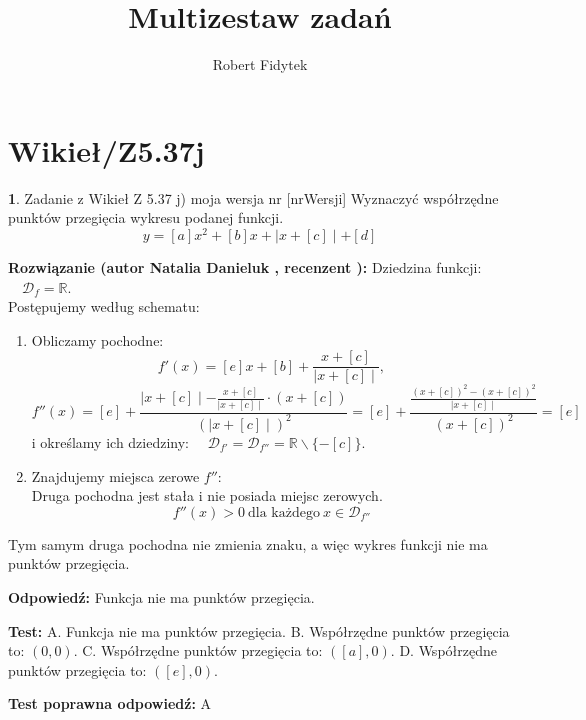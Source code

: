 \documentclass[12pt, a4paper]{article}
\title{Multizestaw zadań}
\author{Robert Fidytek}
\date{}
\theoremstyle{definition} %
\newtheorem{zad}{}
\newcommand{\kategoria}[1]{\section{#1}} %
\newcommand{\zadStart}[1]{\begin{zad}#1\newline} %
\newcommand{\zadStop}{\end{zad}}   %
\newcommand{\rozwStart}[2]{\noindent \textbf{Rozwiązanie (autor #1 , recenzent #2): }\newline} %
\newcommand{\rozwStop}{\newline}                                            %
\newcommand{\odpStart}{\noindent \textbf{Odpowiedź:}\newline}    %
\newcommand{\odpStop}{\newline}                                             %
\newcommand{\testStart}{\noindent \textbf{Test:}\newline} %
\newcommand{\testStop}{\newline} %
\newcommand{\kluczStart}{\noindent \textbf{Test poprawna odpowiedź:}\newline} %
\newcommand{\kluczStop}{\newline} %
\begin{document}
\maketitle

\kategoria{Wikieł/Z5.37j}

\zadStart{Zadanie z Wikieł Z 5.37 j) moja wersja nr [nrWersji]}
Wyznaczyć współrzędne punktów przegięcia wykresu podanej funkcji.
$$y =  [a]x^2 + [b]x + \mid x + [c] \mid + [d]$$
\zadStop

\rozwStart{Natalia Danieluk}{}
Dziedzina funkcji: $\quad \mathcal{D}_f=\mathbb{R}$. \\
Postępujemy według schematu:
\begin{enumerate}
\item Obliczamy pochodne: 
$$f'(x) = [e]x + [b] + \frac{x + [c]}{\mid x + [c] \mid},$$ 
$$f''(x) = [e] + \frac{\mid x + [c] \mid - \frac{x + [c]}{\mid x + [c] \mid}\cdot (x + [c])}{(\mid x + [c] \mid)^2} = [e] + \frac{\frac{(x + [c])^2-(x + [c])^2}{\mid x + [c] \mid}}{(x + [c])^2} = [e]$$
i określamy ich dziedziny: $\quad \mathcal{D}_{f'}=\mathcal{D}_{f''}=\mathbb{R}\backslash\{-[c]\}$. \\
\item Znajdujemy miejsca zerowe $f''$: \\
Druga pochodna jest stała i nie posiada miejsc zerowych.
$$f''(x) > 0 \ \text{dla każdego} \ x \in \mathcal{D}_{f''}$$
\end{enumerate}
Tym samym druga pochodna nie zmienia znaku, a więc wykres funkcji nie ma punktów przegięcia.
\rozwStop

\odpStart
Funkcja nie ma punktów przegięcia.
\odpStop

\testStart
A. Funkcja nie ma punktów przegięcia.
B. Współrzędne punktów przegięcia to: $(0,0)$.
C. Współrzędne punktów przegięcia to:  $([a],0)$.
D. Współrzędne punktów przegięcia to:  $([e],0)$.
\testStop

\kluczStart
A
\kluczStop
\end{document}

